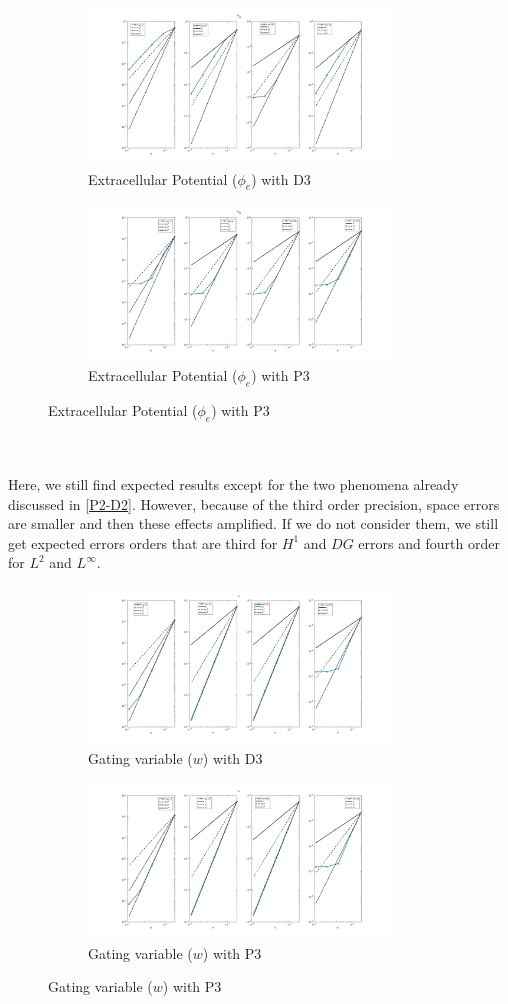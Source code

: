\documentclass[a4paper,11pt]{article}
\begin{document}
\begin{figure}[h]
\begin{subfigure}{0.5\textwidth}
\includegraphics[width = 8cm]{./D3_Phie_1.jpg}
\caption*{Extracellular Potential ($\phi_e$) with D3}
\label{Phie_D3}
\end{subfigure}
\begin{subfigure}{0.5\textwidth}
\includegraphics[width =8cm]{./P3_Phie_1.jpg}
\caption*{Extracellular Potential ($\phi_e$) with P3}
\label{Phie_P3}
\end{subfigure}
\end{figure} \\ \\
\noindent Here, we still find expected results except for the two phenomena already discussed in \ref{P2-D2}. However, because of the third order precision, space errors are smaller and then these effects amplified. If we do not consider them, we still get expected errors orders that are third for $H^1$ and $DG$ errors and fourth order for $L^2$ and $L^\infty$. \\ 
\begin{figure}[h]
\begin{subfigure}{0.5\textwidth}
\includegraphics[width = 8cm]{./D3_w_1.jpg}
\caption*{Gating variable ($w$) with D3}
\label{w_D3}
\end{subfigure}
\begin{subfigure}{0.5\textwidth}
\includegraphics[width =8cm]{./P3_w_1.jpg}
\caption*{Gating variable ($w$) with P3}
\label{w_P3}
\end{subfigure}
\end{figure}
\end{document}
